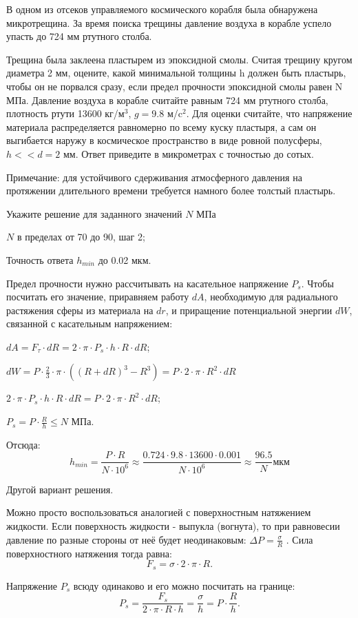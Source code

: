 
В одном из отсеков управляемого космического
корабля была обнаружена микротрещина. За время поиска трещины давление воздуха в
корабле успело упасть до 724 мм ртутного столба. 

Трещина была заклеена
пластырем из эпоксидной смолы. Считая трещину кругом диаметра 2 мм, оцените,
какой минимальной толщины h
должен быть пластырь, чтобы он не порвался сразу, если предел прочности
эпоксидной смолы равен N МПа. Давление воздуха в корабле считайте равным 724 мм ртутного столба, плотность ртути 13600 кг/м$^3$, $g=9.8$ м/c$^2$. Для оценки считайте, что напряжение материала распределяется равномерно по всему
куску пластыря, а сам он выгибается наружу в космическое пространство в виде
ровной полусферы,  $h << d = 2$ мм. Ответ приведите в микрометрах с точностью до сотых.

Примечание:
для устойчивого сдерживания атмосферного давления на протяжении длительного
времени требуется намного более толстый пластырь.

Укажите решение для заданного значений $N$ МПа

\paramSection

$N$ в пределах от 70 до 90, шаг 2;         

Точность ответа  $h_{min}$  до  0.02 мкм.

\solutionSection

Предел прочности нужно рассчитывать на касательное напряжение $P_s$. Чтобы посчитать его значение, 
приравняем работу $dA$, необходимую для радиального растяжения сферы из материала на $dr$, и приращение 
потенциальной энергии $dW$, связанной с касательным напряжением:

$dA=F_{\tau} \cdot dR=2 \cdot \pi \cdot P_s \cdot h \cdot R \cdot dR$; 

$dW=P \cdot \frac{2}{3} \cdot \pi \cdot ((R+dR)^3-R^3 )=P \cdot 2 \cdot \pi \cdot R^2 \cdot dR$ 

$2 \cdot \pi \cdot P_s \cdot h \cdot R \cdot dR=P \cdot 2 \cdot \pi \cdot R^2 \cdot dR$; 

$ P_s=P \cdot \frac{R}{h} \leq N$ МПа.  

Отсюда:
$$h_{min}=\frac{P \cdot R}{N \cdot 10^6} \approx \frac{0.724 \cdot 9.8 \cdot 13600 \cdot 0.001}{N \cdot 10^6} \approx \frac{96.5}{N}  \text{мкм}$$

Другой вариант решения.

Можно просто воспользоваться аналогией с поверхностным натяжением жидкости. 
Если поверхность жидкости - выпукла (вогнута), то при равновесии давление по разные стороны от 
неё будет неодинаковым:  $\Delta P= \frac{\sigma}{R}$ . Сила поверхностного натяжения тогда равна: 
$$F_s= \sigma  \cdot 2 \cdot \pi \cdot R.$$

Напряжение $P_s$ всюду одинаково и его можно посчитать на границе:  
$$P_s=\frac{F_s}{2 \cdot \pi \cdot R \cdot h}= \frac{\sigma}{h}=P \cdot \frac{R}{h}.$$


